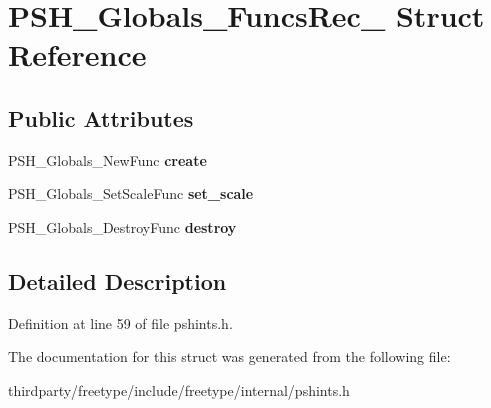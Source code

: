 \hypertarget{struct_p_s_h___globals___funcs_rec__}{}\section{P\+S\+H\+\_\+\+Globals\+\_\+\+Funcs\+Rec\+\_\+ Struct Reference}
\label{struct_p_s_h___globals___funcs_rec__}
\subsection*{Public Attributes}
\begin{DoxyCompactItemize}
\item 
\mbox{\label{struct_p_s_h___globals___funcs_rec___ac136cec55ea33a2e3b60ffdad20f5420}} 
P\+S\+H\+\_\+\+Globals\+\_\+\+New\+Func {\bfseries create}
\item 
\mbox{\label{struct_p_s_h___globals___funcs_rec___a9c97456d3f521cb1091f08c2bda27332}} 
P\+S\+H\+\_\+\+Globals\+\_\+\+Set\+Scale\+Func {\bfseries set\+\_\+scale}
\item 
\mbox{\label{struct_p_s_h___globals___funcs_rec___aebb5534f8305a189b09adfebff4f57ba}} 
P\+S\+H\+\_\+\+Globals\+\_\+\+Destroy\+Func {\bfseries destroy}
\end{DoxyCompactItemize}


\subsection{Detailed Description}


Definition at line 59 of file pshints.\+h.



The documentation for this struct was generated from the following file\+:\begin{DoxyCompactItemize}
\item 
thirdparty/freetype/include/freetype/internal/pshints.\+h\end{DoxyCompactItemize}
